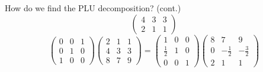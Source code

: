\documentclass{beamer}
\begin{document}
\begin{frame}{How do we find the PLU decomposition? (cont.)}
\[\begin{pmatrix}{}
                4 & 3 & 3 \\
                2 & 1 & 1
            \end{pmatrix}
            \]
            \[
  \begin{pmatrix}{}
                0 & 0 & 1 \\
                0 & 1 & 0 \\
                1 & 0 & 0
            \end{pmatrix}\begin{pmatrix}{}
                2 & 1 & 1 \\
                4 & 3 & 3 \\
                8 & 7 & 9
            \end{pmatrix}
            =\begin{pmatrix}{}
                1 & 0 & 0 \\
                \frac{1}{2} & 1 & 0 \\
                0 & 0 & 1
            \end{pmatrix}
            \begin{pmatrix}{}
                8 & 7 & 9 \\
                0 & -\frac{1}{2} & -\frac{3}{2} \\
                2 & 1 & 1
            \end{pmatrix}
            \]

\end{frame}
\end{document}
